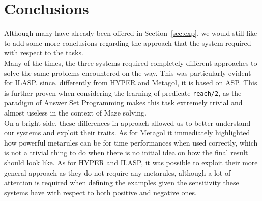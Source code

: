 \section{Conclusions}\label{sec:conc}
Although many have already been offered in Section~\ref{sec:exp},
we would still like to add some more conclusions regarding the approach
that the system required with respect to the tasks.\\
Many of the times, the three systems required completely different approaches
to solve the same problems encountered on the way. This was particularly evident for ILASP, since,
differently from HYPER and Metagol, it is based on ASP. This is further proven when
considering the learning of predicate \texttt{reach/2}, as the paradigm of Answer Set
Programming makes this task extremely trivial and almost useless in the context of
Maze solving.\\
On a bright side, these differences in approach allowed us to better understand our
systems and exploit their traits. As for Metagol it immediately highlighted how powerful metarules can be for
time performances when used correctly, which is not a trivial thing to do when there is no
initial idea on how the final result should look like. As for HYPER and ILASP, it was possible to exploit
their more general approach as they do not require any metarules, although a lot of attention is required
when defining the examples given the sensitivity these systems have with respect to both positive and negative ones.

